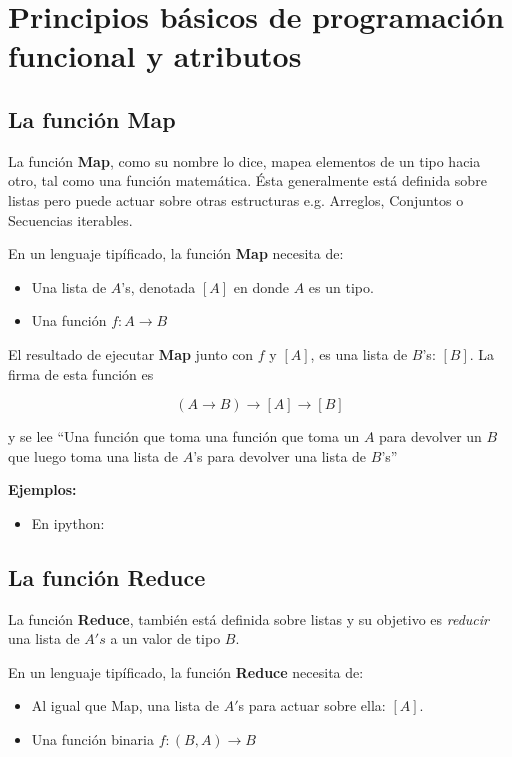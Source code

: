 \documentclass[spanish]{article}
\begin{document}
\section{Principios básicos de programación funcional y atributos}

\subsection{La función Map}
La función \textbf{Map}, como su nombre lo dice, mapea elementos de un tipo hacia otro, tal como una función matemática. Ésta generalmente está definida sobre listas pero puede actuar sobre otras estructuras e.g. Arreglos, Conjuntos o Secuencias iterables.

En un lenguaje tipíficado, la función \textbf{Map} necesita de:
\begin{itemize}
  \item Una lista de $A$'s, denotada $[A]$ en donde $A$ es un tipo.
  \item Una función $f: A \rightarrow B$
\end{itemize}

El resultado de ejecutar \textbf{Map} junto con $f$ y $[A]$, es una lista de $B$'s: $[B]$. La firma de esta función es 

\[ (A \rightarrow B) \rightarrow [A] \rightarrow [B]\]

y se lee ``Una función que toma una función que toma un $A$ para devolver un $B$ que luego toma una lista de $A$'s para devolver una lista de $B$'s''

\textbf{Ejemplos:}
\begin{itemize}
  \item En ipython:
    
\end{itemize}

\subsection{La función Reduce}
La función \textbf{Reduce}, también está definida sobre listas y su objetivo es \textit{reducir} una lista de $A's$ a un valor de tipo $B$.

En un lenguaje tipíficado, la función \textbf{Reduce} necesita de:
\begin{itemize}
  \item Al igual que Map, una lista de $A'$s para actuar sobre ella: $[A]$. 
  \item Una función binaria $f: (B,A) \rightarrow B$
\end{itemize}
\end{document}
